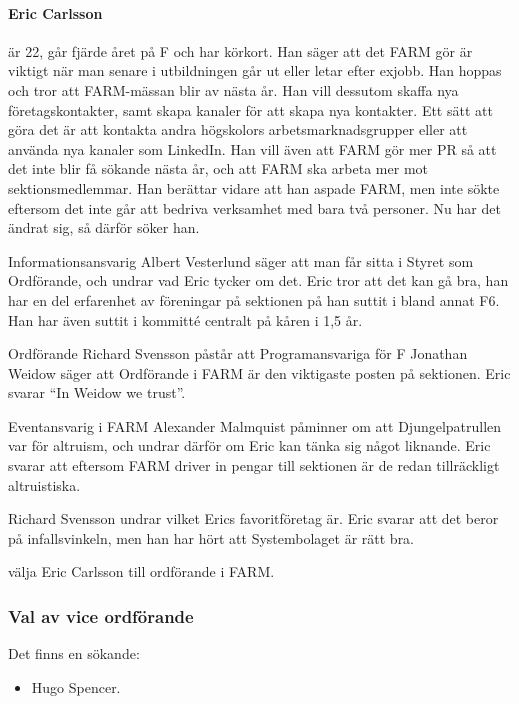 \documentclass[hidelinks]{sektionsmote} %
\begin{document}
\paragraph{Eric Carlsson} är 22, går fjärde året på F och har körkort.
Han säger att det FARM gör är viktigt när man senare i utbildningen går ut eller letar efter exjobb.
Han hoppas och tror att FARM-mässan blir av nästa år.
Han vill dessutom skaffa nya företagskontakter, samt skapa kanaler för att skapa nya kontakter.
Ett sätt att göra det är att kontakta andra högskolors arbetsmarknadsgrupper eller att använda nya kanaler som LinkedIn.
Han vill även att FARM gör mer PR så att det inte blir få sökande nästa år, och att FARM ska arbeta mer mot sektionsmedlemmar.
Han berättar vidare att han aspade FARM, men inte sökte eftersom det inte går att bedriva verksamhet med bara två personer.
Nu har det ändrat sig, så därför söker han.\par
Informationsansvarig Albert Vesterlund säger att man får sitta i Styret som Ordförande, och undrar vad Eric tycker om det.
Eric tror att det kan gå bra, han har en del erfarenhet av föreningar på sektionen på han suttit i bland annat F6.
Han har även suttit i kommitté centralt på kåren i 1,5 år.\par
Ordförande Richard Svensson påstår att Programansvariga för F Jonathan Weidow säger att Ordförande i FARM är den viktigaste posten på sektionen.
Eric svarar \enquote{In Weidow we trust}.\par
Eventansvarig i FARM Alexander Malmquist påminner om att Djungelpatrullen var för altruism, och undrar därför om Eric kan tänka sig något liknande.
Eric svarar att eftersom FARM driver in pengar till sektionen är de redan tillräckligt altruistiska.\par
Richard Svensson undrar vilket Erics favoritföretag är.
Eric svarar att det beror på infallsvinkeln, men han har hört att Systembolaget är rätt bra.

\begin{beslut}
  \item välja Eric Carlsson till ordförande i FARM.
\end{beslut}

\subsubsection{Val av vice ordförande}
Det finns en sökande:
\begin{itemize}
    \item Hugo Spencer.
\end{itemize}
\end{document}
